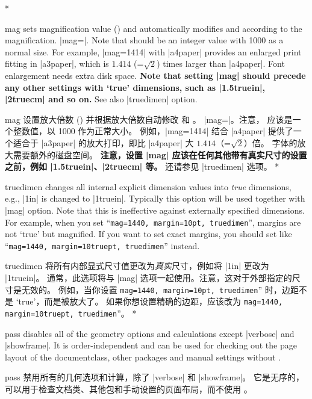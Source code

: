 \begin{Options}
\begin{paracol}{2}
\switchcolumn[0]*\item[\onlypre mag] sets magnification value () and automatically modifies 
   and  according to the magnification.
  |mag=|. Note that  should be an integer value
  with 1000 as a normal size. For example, |mag=1414| with |a4paper|
  provides an enlarged print fitting in |a3paper|, which is $1.414$
  (=$\sqrt{2}$) times larger than |a4paper|. Font enlargement needs extra
  disk space. \textbf{Note that setting |mag| should precede any other
  settings with `true' dimensions, such as  |1.5truein|, |2truecm|
  and so on.} See also |truedimen| option.
\switchcolumn\item[\onlypre mag] 设置放大倍数 () 并根据放大倍数自动修改  和 。
|mag=|。注意， 应该是一个整数值，以 1000 作为正常大小。
例如，|mag=1414| 结合 |a4paper| 提供了一个适合于 |a3paper| 的放大打印，即比 |a4paper| 大 $1.414$（=$\sqrt{2}$）倍。
字体的放大需要额外的磁盘空间。
\textbf{注意，设置 |mag| 应该在任何其他带有真实尺寸的设置之前，例如 |1.5truein|、|2truecm| 等。}
还请参见 |truedimen| 选项。
\switchcolumn[0]*\item[\onlypre truedimen] changes all internal explicit dimension values into 
  \textit{true} dimensions, e.g., |1in| is changed to |1truein|.
  Typically this option will be used together with |mag| option. Note that
  this is ineffective against externally specified dimensions. For example,
  when you set ``\texttt{mag=1440, margin=10pt, truedimen}'', margins are
  not `true' but magnified. If you want to set exact margins, you should
  set like ``\texttt{mag=1440, margin=10truept, truedimen}'' instead.
\switchcolumn\item[\onlypre truedimen] 将所有内部显式尺寸值更改为\textit{真实}尺寸，例如将 |1in| 更改为 |1truein|。
通常，此选项将与 |mag| 选项一起使用。注意，这对于外部指定的尺寸是无效的。
例如，当你设置 \texttt{mag=1440, margin=10pt, truedimen}'' 时，边距不是 `true'，而是被放大了。   如果你想设置精确的边距，应该改为 \texttt{mag=1440, margin=10truept, truedimen}''。
\switchcolumn[0]*\item[\onlypre pass] disables all of the geometry options and calculations
  except |verbose| and |showframe|. It is order-independent and can be
  used for checking out the page layout of the documentclass, other
  packages and manual settings without \Gm.
\switchcolumn\item[\onlypre pass] 禁用所有的几何选项和计算，除了 |verbose| 和 |showframe|。
它是无序的，可以用于检查文档类、其他包和手动设置的页面布局，而不使用 \Gm。

\end{paracol}
\end{Options}
